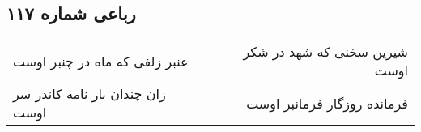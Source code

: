 \begin{center}
\section*{رباعی شماره ۱۱۷}
\label{sec:sh117}
\begin{longtable}{l p{0.5cm} r}
عنبر زلفی که ماه در چنبر اوست
&&
شیرین سخنی که شهد در شکر اوست
\\
زان چندان بار نامه کاندر سر اوست
&&
فرمانده روزگار فرمانبر اوست
\\
\end{longtable}
\end{center}
